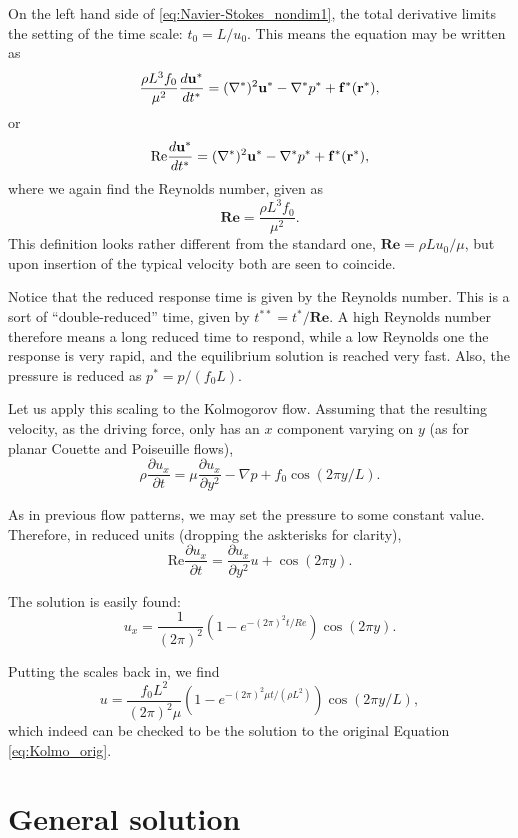 On the left hand side of \ref{eq:Navier-Stokes_nondim1}, the total
derivative limits the setting of the time scale: $t_0=L/u_0$. This
means the equation may be written as
\[
\frac{\rho L^3 f_0}{\mu^2}
\frac{d \mathbf{u}^*}{d t^*} =
(\nabla^*)^2 \mathbf{u}^*
-\nabla^* p^* + \mathbf{f}^*(\mathbf{r}^*) ,
\]
or
\begin{equation}
\label{eq:Navier-Stokes_nondim2}
\mathrm{Re}
\frac{d \mathbf{u}^*}{d t^*} =
(\nabla^*)^2 \mathbf{u}^*
-\nabla^* p^* + \mathbf{f}^*(\mathbf{r}^*) ,
\end{equation}
where we again find the Reynolds number, given as
\[
  \mathbf{Re}=\frac{\rho L^3 f_0 }{\mu^2}.
\]
This definition looks rather different from the standard one,
$ \mathbf{Re}=\rho L u_0 / \mu$, but upon insertion of
the typical velocity both are seen to coincide.

Notice that the reduced response time is given by the Reynolds number.
This is a sort of ``double-reduced'' time, given by
$t^{**}= t^* / \mathbf{Re}$. A high Reynolds number therefore means a
long reduced time to respond, while a low Reynolds one the response is
very rapid, and the equilibrium solution is reached very fast. Also,
the pressure is reduced as $p^*= p / ( f_0 L ) $.

Let us apply this scaling to the Kolmogorov flow. Assuming that the
resulting velocity, as the driving force, only has an $x$ component
varying on $y$ (as for planar Couette and Poiseuille flows),
\begin{equation}
\label{eq:Kolmo_orig}
  \rho \frac{\partial u_x}{\partial t} =
  \mu \frac{\partial u_x}{\partial y^2} - \nabla p +   f_0 \cos(2\pi y/L)  .
\end{equation}

As in previous flow patterns, we may set the pressure to some constant
value. Therefore, in reduced units (dropping the askterisks for
clarity),
\[
  \mathrm{Re} \frac{\partial u_x}{\partial t} =
  \frac{\partial  u_x}{\partial y^2} u + \cos(2\pi y) .
\]

The solution is easily found:
\[
  u_x = \frac{1}{(2\pi)^2} \left( 1-e^{ - (2\pi)^2 t/Re } \right)
  \cos(2\pi y) .
\]

Putting the scales back in, we find
\[
  u = \frac{ f_0 L^2 }{(2\pi)^2 \mu} \left( 1-e^{- (2\pi)^2 \mu t /
      (\rho L^2) } \right) \cos(2\pi y/L) ,
\]
which indeed can be checked to be the solution to the original
Equation \ref{eq:Kolmo_orig}.


\section{General solution}

